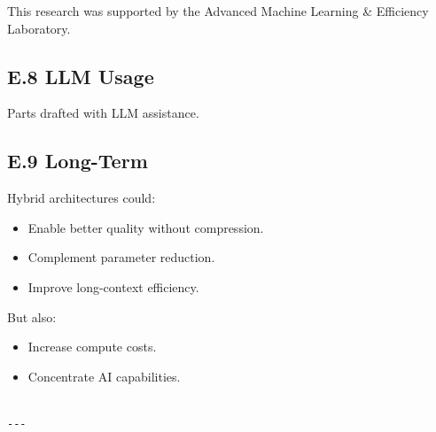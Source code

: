 This research was supported by the Advanced Machine Learning \& Efficiency Laboratory.

\subsection{E.8 LLM Usage}

Parts drafted with LLM assistance.

\subsection{E.9 Long-Term}

Hybrid architectures could:
\begin{itemize}
\item Enable better quality without compression.
\item Complement parameter reduction.
\item Improve long-context efficiency.

\end{itemize}
But also:
\begin{itemize}
\item Increase compute costs.
\item Concentrate AI capabilities.
\end{itemize}
\begin{lstlisting}

---
\end{lstlisting}